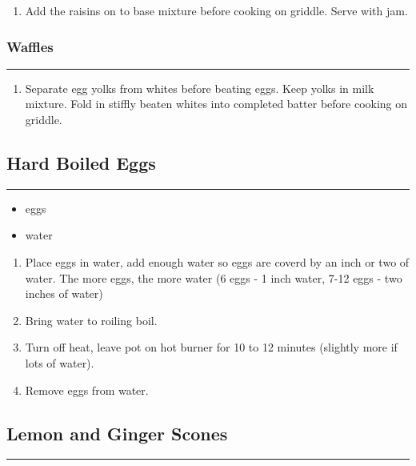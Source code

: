 \documentclass{article}
\begin{document}
\begin{enumerate}
    \item 
        Add the raisins on to base mixture before cooking on griddle. Serve with jam.
\end{enumerate}

\subsubsection{Waffles} 
\noindent\rule[0.5ex]{\linewidth}{0.5pt}

\begin{enumerate}
    \item 
        Separate egg yolks from whites before beating eggs. Keep yolks in milk mixture. Fold in stiffly beaten whites into completed batter before cooking on griddle.
\end{enumerate}
\newpage 

\subsection{Hard Boiled Eggs} 
\noindent\rule[0.5ex]{\linewidth}{1pt}

\begin{framed}
\begin{itemize}
    \item eggs
    \item water
\end{itemize}
\end{framed}

\begin{enumerate}
    \item 
        Place eggs in water, add enough water so eggs are coverd by an inch or two of water. The more eggs, the more water (6 eggs - 1 inch water, 7-12 eggs - two inches of water)
    \item 
        Bring water to roiling boil.
    \item 
        Turn off heat, leave pot on hot burner for 10 to 12 minutes (slightly more if lots of water).
    \item 
        Remove eggs from water.
\end{enumerate}
\newpage

\subsection{Lemon and Ginger Scones} 
\noindent\rule[0.5ex]{\linewidth}{1pt}
\end{document}
